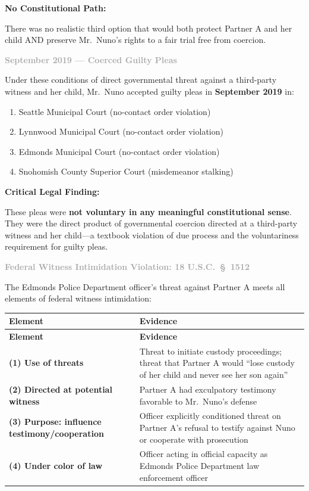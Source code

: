 \documentclass[11pt, letterpaper]{article}
\newcommand{\subsubsectiontitle}[1]{\vspace{0.1in}\noindent\textcolor{DarkGray}{\textbf{#1}}\vspace{0.05in}}
\begin{document}
\textbf{No Constitutional Path:}

There was no realistic third option that would both protect Partner A and her child AND preserve Mr.\ Nuno's rights to a fair trial free from coercion.

\subsubsectiontitle{September 2019 --- Coerced Guilty Pleas}

Under these conditions of direct governmental threat against a third-party witness and her child, Mr.\ Nuno accepted guilty pleas in \textbf{September 2019} in:
\begin{enumerate}[leftmargin=*,itemsep=2pt]
    \item Seattle Municipal Court (no-contact order violation)
    \item Lynnwood Municipal Court (no-contact order violation)
    \item Edmonds Municipal Court (no-contact order violation)
    \item Snohomish County Superior Court (misdemeanor stalking)
\end{enumerate}

\textbf{Critical Legal Finding:}

These pleas were \textbf{not voluntary in any meaningful constitutional sense}. They were the direct product of governmental coercion directed at a third-party witness and her child---a textbook violation of due process and the voluntariness requirement for guilty pleas.

\subsubsectiontitle{Federal Witness Intimidation Violation: 18 U.S.C.\ \S\ 1512}

The Edmonds Police Department officer's threat against Partner A meets all elements of federal witness intimidation:

\begin{center}
\begin{longtable}{|p{1.8in}|p{4.2in}|}
\hline
\textbf{Element} & \textbf{Evidence} \\
\hline
\endfirsthead
\hline
\textbf{Element} & \textbf{Evidence} \\
\hline
\endhead
\textbf{(1) Use of threats} & Threat to initiate custody proceedings; threat that Partner A would ``lose custody of her child and never see her son again'' \\
\hline
\textbf{(2) Directed at potential witness} & Partner A had exculpatory testimony favorable to Mr.\ Nuno's defense \\
\hline
\textbf{(3) Purpose: influence testimony/cooperation} & Officer explicitly conditioned threat on Partner A's refusal to testify against Nuno or cooperate with prosecution \\
\hline
\textbf{(4) Under color of law} & Officer acting in official capacity as Edmonds Police Department law enforcement officer \\
\hline
\end{longtable}
\end{center}
\end{document}
